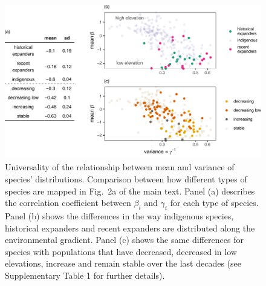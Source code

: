 \documentclass[11pt, a4paper]{article}
\begin{document}
\clearpage

\begin{figure}[ht]
  \centering
    \vspace{0.5cm}
    \includegraphics[width=1\textwidth]{figures/Rapaport-species-differences}
    	  \vspace{0.3cm}
	   \caption{Universality of the relationship between mean and variance of species' distributions. Comparison between how different types of species are mapped in Fig.~2a of the main text. Panel (a) describes the correlation coefficient between $\beta_i$ and $\gamma_i$ for each type of species. Panel (b) shows the differences in the way indigenous species, historical expanders and recent expanders are distributed along the environmental gradient. Panel (c) shows the same differences for species with populations that have decreased, decreased in low elevations, increase and remain stable over the last decades (see Supplementary Table 1 for further details).}
      \label{sfig:rapaport-types}
\end{figure}

\clearpage
\end{document}
